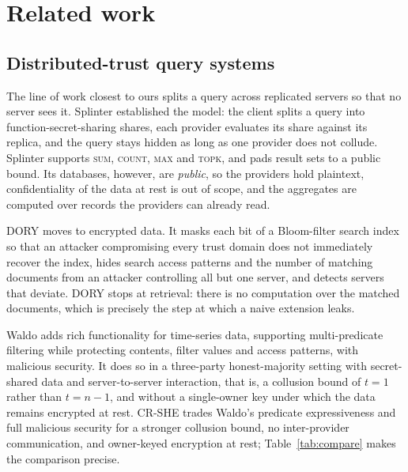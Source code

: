 \documentclass[a4paper,fleqn]{cas-dc}
\begin{document}
\section{Related work}
\label{sec:related}

\subsection{Distributed-trust query systems}
The line of work closest to ours splits a query across replicated servers so
that no server sees it. Splinter \citep{splinter} established the model: the
client splits a query into function-secret-sharing shares, each provider
evaluates its share against its replica, and the query stays hidden as long as
one provider does not collude. Splinter supports \textsc{sum}, \textsc{count},
\textsc{max} and \textsc{topk}, and pads result sets to a public bound. Its
databases, however, are \emph{public}, so the providers hold plaintext,
confidentiality of the data at rest is out of scope, and the aggregates are
computed over records the providers can already read.

DORY \citep{dory} moves to encrypted data. It masks each bit of a
Bloom-filter search index so that an attacker compromising every trust domain
does not immediately recover the index, hides search access patterns and the
number of matching documents from an attacker controlling all but one server,
and detects servers that deviate. DORY stops at retrieval: there is no
computation over the matched documents, which is precisely the step at which a
naive extension leaks.

Waldo \citep{waldo} adds rich functionality for time-series data, supporting
multi-predicate filtering while protecting contents, filter values and access
patterns, with malicious security. It does so in a three-party honest-majority
setting with secret-shared data and server-to-server interaction, that is, a
collusion bound of $t=1$ rather than $t=n-1$, and without a single-owner key
under which the data remains encrypted at rest. CR-SHE trades Waldo's
predicate expressiveness and full malicious security for a stronger collusion
bound, no inter-provider communication, and owner-keyed encryption at rest;
Table~\ref{tab:compare} makes the comparison precise.
\end{document}
